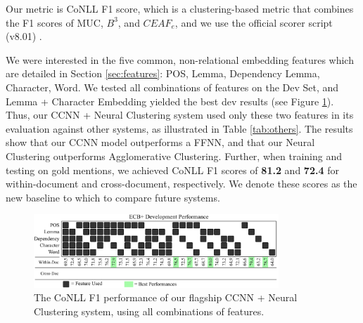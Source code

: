 \documentclass[11pt,a4paper]{article}
\begin{document}
Our metric is CoNLL F1 score, which is a clustering-based metric that combines the F1 scores of MUC, $B^{3}$, and $CEAF_{e}$, and we use the official scorer script (v8.01) \cite{Pradhan+etal:14a}.

We were interested in the five common, non-relational embedding features which are detailed in Section \ref{sec:features}: POS, Lemma, Dependency Lemma, Character, Word.  We tested all combinations of features on the Dev Set, and Lemma + Character Embedding yielded the best dev results (see Figure \ref{fig:allfeatures}).  Thus, our CCNN + Neural Clustering system used only these two features in its evaluation against other systems, as illustrated in Table \ref{tab:others}.  The results show that our CCNN model outperforms a FFNN, and that our Neural Clustering outperforms Agglomerative Clustering.  Further, when training and testing on gold mentions, we achieved CoNLL F1 scores of \textbf{81.2} and \textbf{72.4} for within-document and cross-document, respectively.  We denote these scores as the new baseline to which to compare future systems.

\begin{figure}[h]
\centering
	\includegraphics[width=0.82\textwidth]{features.pdf}
	\caption{The CoNLL F1 performance of our flagship CCNN + Neural Clustering system, using all combinations of features.}
	\label{fig:allfeatures}
\end{figure}
\end{document}
